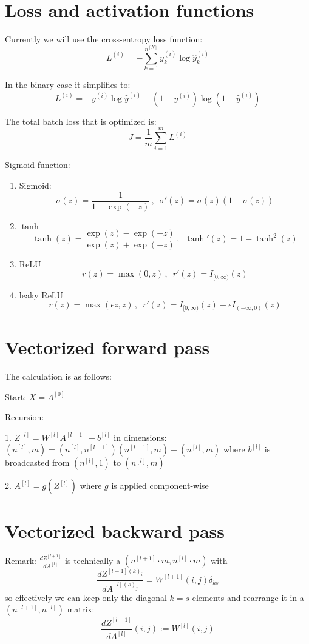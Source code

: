 \documentclass[10pt,a4paper]{article}
\begin{document}
\section{Loss and activation  functions}
\label{sec:loss}
Currently we will use the cross-entropy loss function:
\[ L^{(i)} = -\sum_{k=1}^{n^{[N]}} y^{(i)}_k \log \hat{y}^{(i)}_k   \]

In the binary case it simplifies to: 
\[ L^{(i)} = - y^{(i)} \log \hat{y}^{(i)}  - (1-y^{(i)} ) \log (1-\hat{y}^{(i)} )    \]

The total batch loss that is optimized is:
\[  J = \frac{1}{m} \sum_{i=1}^{m} L^{(i)}     \]

Sigmoid function:
\begin{enumerate}
\item Sigmoid: 
\[\sigma(z)=\frac{1}{1+\exp(-z)}\,,\,\,\,\sigma'(z)=\sigma(z)(1-\sigma(z)) \]
\item $\tanh$ 
\[\tanh(z)=\frac{\exp(z)-\exp(-z)}{\exp(z)+\exp(-z)}\,,\,\,\,\tanh'(z)=1-\tanh^2(z) \]
\item ReLU
\[r(z)=\max(0, z)\, ,\,\,\, r'(z)=I_{[0, \infty)}(z) \]
\item leaky ReLU
\[ r(z)= \max(\epsilon z, z) \, ,\,\,\, r'(z)=I_{[0, \infty)}(z) + \epsilon I_{( -\infty, 0)}(z)  \]
\end{enumerate}

\section{Vectorized forward pass}
\label{sec:for}
The calculation is as follows:
 
Start:  $X=A^{[0]}$

Recursion:  

1. $Z^{[l]} = W^{[l]} A^{[l-1]} + b^{[l]} $  in dimensions:   $(n^{[l]},m) = (n^{[l]},n^{[l-1]}) (n^{[l-1]},m) + (n^{[l]},m)$ where $ b^{[l]}$ is broadcasted from $(n^{[l]},1)$ to  $(n^{[l]},m)$ 

2. $A^{[l]} = g(Z^{[l]})$ where $g$ is applied component-wise
 



\section{Vectorized backward pass}
\label{sec:back}
Remark: $\frac{d Z^{[l+1]} }{ d A^{[l]}}$ is technically a $(n^{[l+1]}\cdot m, n^{[l]}\cdot m)$ with
\[ \frac{d Z^{[l+1](k)_i} }{ d A^{[l](s)_j}}= W^{[l+1]}(i,j) \delta_{ks} \]
so effectively we can keep only the diagonal $k=s$ elements and rearrange it in a $(n^{[l+1]} , n^{[l]} )$ matrix:
\[ \frac{d Z^{[l+1]} }{ d A^{[l]}}(i,j) := W^{[l]}(i,j)  \]
\end{document}
